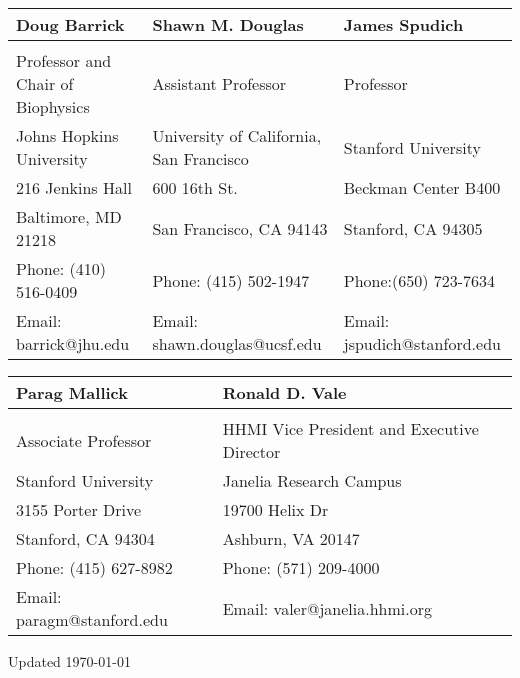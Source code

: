 \documentclass[12pt,letterpaper]{report}
\begin{document}
    \begin{tabular}{lll}
        Doug Barrick&  Shawn M. Douglas & James Spudich \\
        \hline \\
        Professor and Chair of Biophysics  & Assistant Professor & Professor \\
        Johns Hopkins University  & University of California, San Francisco & Stanford University \\
        216 Jenkins Hall  & 600 16th St. & Beckman Center B400 \\
        Baltimore, MD 21218  & San Francisco, CA 94143 & Stanford, CA 94305 \\
        Phone: (410) 516-0409 & Phone: (415) 502-1947 & Phone:(650) 723-7634\\
        Email: barrick@jhu.edu  & Email: shawn.douglas@ucsf.edu & Email: jspudich@stanford.edu

    \end{tabular}

    \vspace{3em}

    \begin{tabular}{ll}
        Parag Mallick & Ronald D. Vale \\
        \hline \\
        Associate Professor &  HHMI Vice President and Executive Director \\
        Stanford University & Janelia Research Campus \\
        3155 Porter Drive & 19700 Helix Dr \\
        Stanford, CA 94304 & Ashburn, VA 20147 \\
        Phone: (415) 627-8982 & Phone: (571) 209-4000\\
        Email: paragm@stanford.edu & Email: valer@janelia.hhmi.org
    \end{tabular}

    \begin{center}
        \vfill
        Updated \monthyeardate\today
    \end{center}
\end{document}
